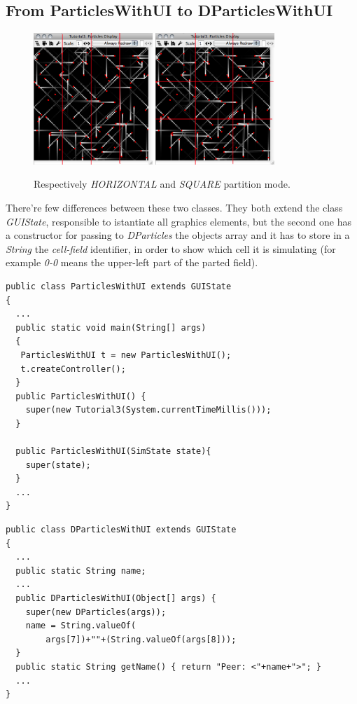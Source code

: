 \documentclass[12pt]{article}
\begin{document}
\subsection{From ParticlesWithUI to DParticlesWithUI}
\begin{figure}
	\centering
		\includegraphics[width=0.4\textwidth,bb=0 0 470 520]{particles-h.png}	
		\includegraphics[width=0.4\textwidth,bb=0 0 470 520]{particles-m.png}
		\caption{Respectively \textit{HORIZONTAL} and \textit{SQUARE} partition mode.}
	\label{fig:dp01}
\end{figure}
There're few differences between these two classes. They both extend the class \textit{GUIState}, responsible to istantiate all graphics elements, but the second one has a constructor for passing to \textit{DParticles} the objects array and it has to store in a \textit{String} the \textit{cell-field} identifier, in order to show which cell it is simulating (for example \textit{0-0} means the upper-left part of the parted field).
\begin{lstlisting}
public class ParticlesWithUI extends GUIState
{
  ...
  public static void main(String[] args)
  {
   ParticlesWithUI t = new ParticlesWithUI();
   t.createController();
  }
  public ParticlesWithUI() { 
  	super(new Tutorial3(System.currentTimeMillis()));
  }
  
  public ParticlesWithUI(SimState state){
  	super(state);
  }
  ...
}
\end{lstlisting}
\medskip
{}
\begin{lstlisting}
public class DParticlesWithUI extends GUIState
{
  ...
  public static String name;
  ...
  public DParticlesWithUI(Object[] args) {
    super(new DParticles(args));
    name = String.valueOf(
    	args[7])+""+(String.valueOf(args[8]));
  }
  public static String getName() { return "Peer: <"+name+">"; }
  ...
}

\end{lstlisting}
\end{document}
